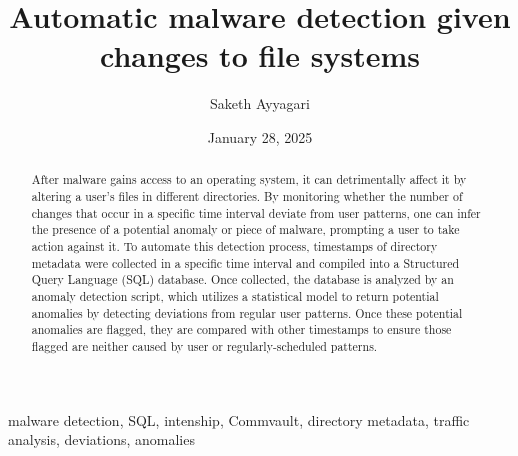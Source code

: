 \documentclass[12pt,conference,onecolumn]{IEEEtran}
\title{Automatic malware detection given changes to file systems}
\author{Saketh Ayyagari}
\date{January 28, 2025}
\begin{document}
\maketitle 

\begin{abstract}
After malware gains access to an operating system, it can detrimentally affect it by altering a user's files in different directories. By monitoring whether the number of changes that occur in a specific time interval deviate from user patterns, one can infer the presence of a potential anomaly or piece of malware, prompting a user to take action against it. To automate this detection process, timestamps of directory metadata were collected in a specific time interval and compiled into a Structured Query Language (SQL) database. Once collected, the database is analyzed by an anomaly detection script, which utilizes a statistical model to return potential anomalies by detecting deviations from regular user patterns. Once these potential anomalies are flagged, they are compared with other timestamps to ensure those flagged are neither caused by user or regularly-scheduled patterns. 
\end{abstract}

\begin{IEEEkeywords}
malware detection, SQL, intenship, Commvault, directory metadata, traffic analysis, deviations, anomalies
\end{IEEEkeywords}
\end{document}
